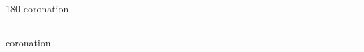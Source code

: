 
\begin{frame}
\begin{center}
\begin{turn}{180}
{\fontsize{2.5cm}{1em}\selectfont coronation}
\end{turn}
\vspace{1em}\par  
\hrule
\vspace{1em}\par  
{\fontsize{2.5cm}{1em}\selectfont coronation}
\end{center}
\end{frame}

